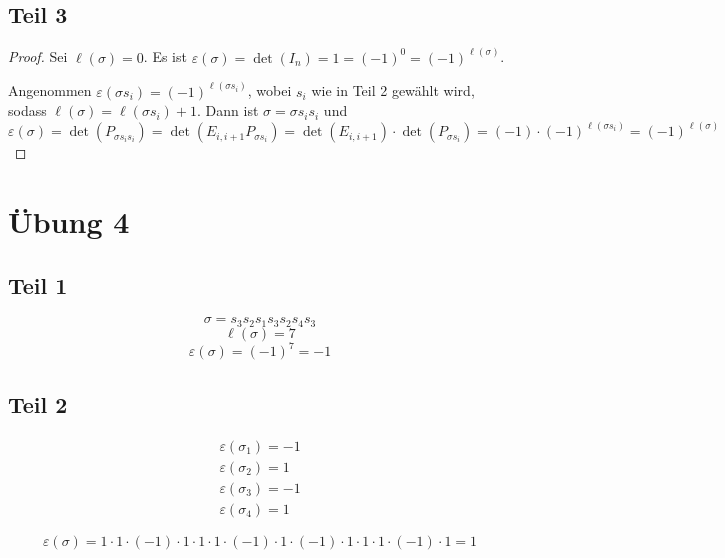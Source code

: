 \documentclass[10pt,a4paper]{article}
\begin{document}
\subsection*{Teil 3}

\begin{proof}
Sei $\ell(\sigma) = 0$.
Es ist $\varepsilon(\sigma) = \det(I_{n}) = 1 = (-1)^{0} = (-1)^{\ell(\sigma)}$.

Angenommen $\varepsilon(\sigma s_{i}) = (-1)^{\ell(\sigma s_{i})}$, wobei $s_{i}$ wie in Teil 2 gewählt wird, sodass $\ell(\sigma) = \ell(\sigma s_{i}) + 1$.
Dann ist $\sigma = \sigma s_{i} s_{i}$ und
\begin{equation}
\varepsilon(\sigma) = \det(P_{\sigma s_{i} s_{i}}) = \det(E_{i,i + 1}P_{\sigma s_{i}}) = \det(E_{i,i + 1}) \cdot \det(P_{\sigma s_{i}}) = (-1) \cdot (-1)^{\ell(\sigma s_{i})} = (-1)^{\ell(\sigma)}
\end{equation}
\end{proof}

\section*{Übung 4}

\subsection*{Teil 1}

\begin{equation}
\sigma = s_{3}s_{2}s_{1}s_{3}s_{2}s_{4}s_{3}
\end{equation}
\begin{equation}
\ell(\sigma) = 7
\end{equation}
\begin{equation}
\varepsilon(\sigma) = (-1)^{7} = -1
\end{equation}

\subsection*{Teil 2}

\begin{align*}
\varepsilon(\sigma_{1}) = -1\\
\varepsilon(\sigma_{2}) = 1\\
\varepsilon(\sigma_{3}) = -1\\
\varepsilon(\sigma_{4}) = 1
\end{align*}

\begin{equation}
\varepsilon(\sigma) = 1 \cdot 1 \cdot (-1) \cdot 1 \cdot 1 \cdot 1 \cdot (-1) \cdot 1 \cdot (-1) \cdot 1 \cdot 1 \cdot 1 \cdot (-1) \cdot 1 = 1
\end{equation}
\end{document}
